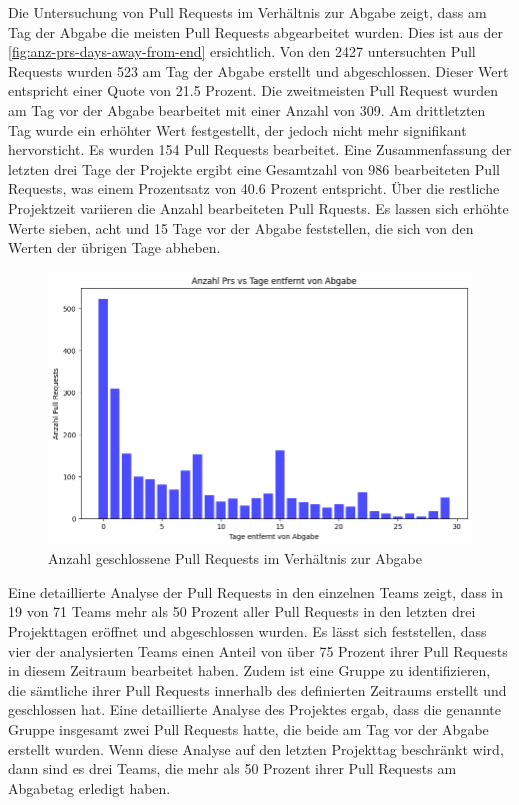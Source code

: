 Die Untersuchung von Pull Requests im Verhältnis zur Abgabe zeigt, dass am Tag der Abgabe die meisten Pull Requests abgearbeitet wurden. Dies ist aus der \autoref{fig:anz-prs-days-away-from-end} ersichtlich. Von den 2427 untersuchten Pull Requests wurden 523 am Tag der Abgabe erstellt und abgeschlossen. Dieser Wert entspricht einer Quote von 21.5 Prozent.  Die zweitmeisten Pull Request wurden am Tag vor der Abgabe bearbeitet mit einer Anzahl von 309. Am drittletzten Tag wurde ein erhöhter Wert festgestellt, der jedoch nicht mehr signifikant hervorsticht. Es wurden 154 Pull Requests bearbeitet. Eine Zusammenfassung der letzten drei Tage der Projekte ergibt eine Gesamtzahl von 986 bearbeiteten Pull Requests, was einem Prozentsatz von 40.6 Prozent entspricht. Über die restliche Projektzeit variieren die Anzahl bearbeiteten Pull Rquests. Es lassen sich erhöhte Werte sieben, acht und 15 Tage vor der Abgabe feststellen, die sich von den Werten der übrigen Tage abheben.
\begin{figure}[htbp]
    \includegraphics[width=\textwidth]{Figures/anz-prs-days-away-from-end.png}
    \caption{Anzahl geschlossene Pull Requests im Verhältnis zur Abgabe}
    \label{fig:anz-prs-days-away-from-end}
\end{figure}
\newpage
Eine detaillierte Analyse der Pull Requests in den einzelnen Teams zeigt, dass in 19 von 71 Teams mehr als 50 Prozent aller Pull Requests in den letzten drei Projekttagen eröffnet und abgeschlossen wurden. Es lässt sich feststellen, dass vier der analysierten Teams einen Anteil von über 75 Prozent ihrer Pull Requests in diesem Zeitraum bearbeitet haben. Zudem ist eine Gruppe zu identifizieren, die sämtliche ihrer Pull Requests innerhalb des definierten Zeitraums erstellt und geschlossen hat. Eine detaillierte Analyse des Projektes ergab, dass die genannte Gruppe insgesamt zwei Pull Requests hatte, die beide am Tag vor der Abgabe erstellt wurden. Wenn diese Analyse auf den letzten Projekttag beschränkt wird, dann sind es drei Teams, die mehr als 50 Prozent ihrer Pull Requests am Abgabetag erledigt haben.

